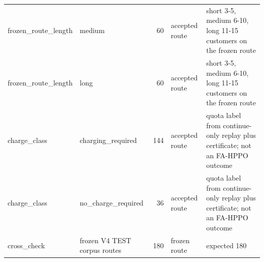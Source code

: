 \begin{tabular}{llrll}
frozen\_route\_length & medium & 60 & accepted route & short 3-5, medium 6-10, long 11-15 customers on the frozen route \\
frozen\_route\_length & long & 60 & accepted route & short 3-5, medium 6-10, long 11-15 customers on the frozen route \\
charge\_class & charging\_required & 144 & accepted route & quota label from continue-only replay plus certificate; not an FA-HPPO outcome \\
charge\_class & no\_charge\_required & 36 & accepted route & quota label from continue-only replay plus certificate; not an FA-HPPO outcome \\
cross\_check & frozen V4 TEST corpus routes & 180 & frozen route & expected 180 \\
\hline
\end{tabular}
